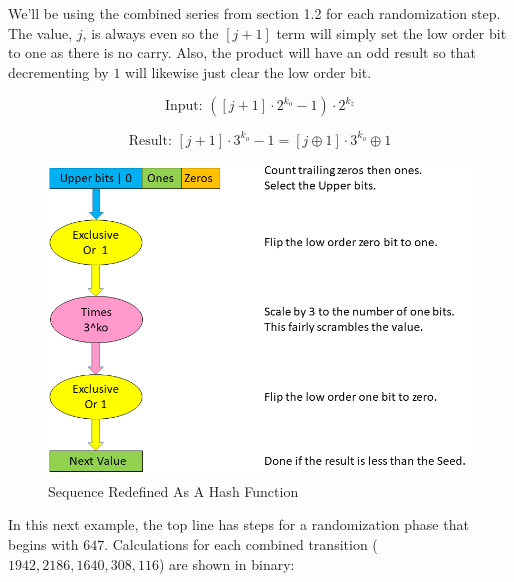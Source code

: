 \documentclass[preprint]{sigplanconf}
\begin{document}
We'll be using the combined series from section 1.2 for each randomization step. The value, $j$, is always even so the $[j + 1]$ term will simply set the low order bit to one as there is no carry. Also, the product will have an odd result so that decrementing by $1$ will likewise just clear the low order bit.


\[
    \text{Input: } ([j + 1] \cdot 2^{k_o} - 1) \cdot 2^{k_z}
\]

\[
    \text{Result: } [j + 1] \cdot 3^{k_o} - 1 = [j \oplus 1] \cdot 3^{k_o} \oplus 1
\]


\begin{figure} [ht]
    \begin{center}
        \includegraphics[width=\columnwidth]{collatz_even}
    \end{center}
    \caption{Sequence Redefined As A Hash Function}
    \label{fig-1}
\end{figure}




In this next example, the top line has steps for a randomization phase that begins with $647$. Calculations for each combined transition ($1942, 2186, 1640, 308, 116$) are shown in binary:
\end{document}
